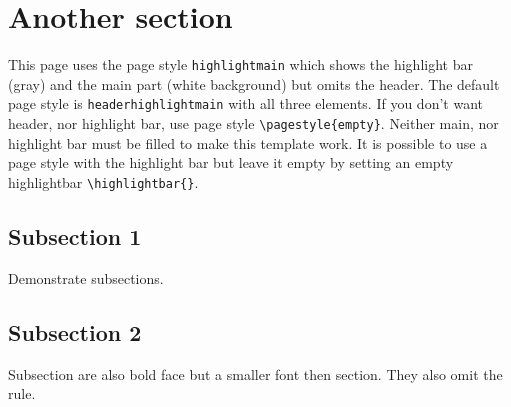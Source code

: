 \section{Another section}

This page uses the page style \texttt{highlightmain} which shows the highlight bar (gray) and the main part (white background) but omits the header. 
The default page style is \texttt{headerhighlightmain} with all three elements.
If you don't want header, nor highlight bar, use page style \texttt{\textbackslash pagestyle\{empty\}}.
\medskip
Neither main, nor highlight bar must be filled to make this template work.
It is possible to use a page style with the highlight bar but leave it empty by setting an empty highlightbar \texttt{\textbackslash highlightbar\{\}}.

\vspace{0.5em}
\subsection{Subsection 1}
Demonstrate subsections.

\subsection{Subsection 2}
Subsection are also bold face but a smaller font then section. They also omit the rule.

